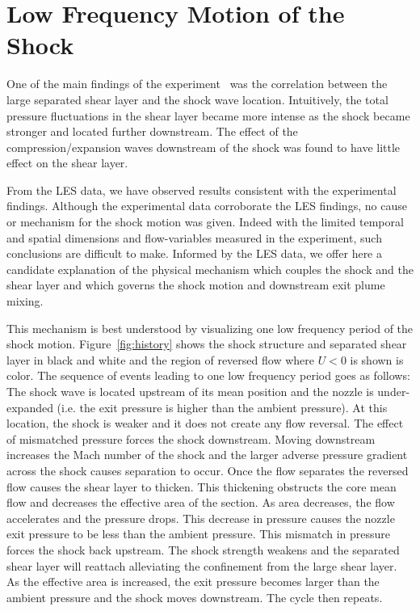 \documentclass[]{aiaa-tc}%
\begin{document}
\section{Low Frequency Motion of the Shock}

One of the main findings of the experiment~\cite{Papam:10} was the correlation between the large separated shear layer and the shock wave location.  Intuitively, the total pressure fluctuations in the shear layer became more intense as the shock became stronger and located further downstream.   The effect of the compression/expansion waves downstream of the shock was found to have little effect on the shear layer.

From the LES data, we have observed results consistent with the experimental findings.  Although the experimental data corroborate the LES findings, no cause or mechanism for the shock motion was given.  Indeed with the limited temporal and spatial dimensions and flow-variables measured in the experiment, such conclusions are difficult to make.  Informed by the LES data, we offer here a candidate explanation of the physical mechanism which couples the shock and the shear layer and which governs the shock motion and downstream exit plume mixing.


This mechanism is best understood by visualizing one low frequency period of the shock motion.  Figure~\ref{fig:history} shows the shock structure and separated shear layer in black and white and the region of reversed flow where $U<0$ is shown is color.  The sequence of events leading to one low frequency period goes as follows:  The shock wave is located upstream of its mean position and the nozzle is under-expanded (i.e. the exit pressure is higher than the ambient pressure).  At this location, the shock is weaker and it does not create any flow reversal.  The effect of mismatched pressure forces the shock downstream.  Moving downstream increases the Mach number of the shock and the larger adverse pressure gradient across the shock causes separation to occur.  Once the flow separates the reversed flow causes the shear layer to thicken.  This thickening obstructs the core mean flow and decreases the effective area of the section.  As area decreases, the flow accelerates and the pressure drops.  This decrease in pressure causes the nozzle exit pressure to be less than the ambient pressure.  This mismatch in pressure forces the shock back upstream.  The shock strength weakens and the separated shear layer will reattach alleviating the confinement from the large shear layer.  As the effective area is increased, the exit pressure becomes larger than the ambient pressure and the shock moves downstream.  The cycle then repeats.
\end{document}
